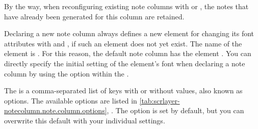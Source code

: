 By the way, when reconfiguring existing note columns with
 or , the notes that have
already been generated for this column are retained.

%
%
Declaring a new note column always defines a new element for changing its font
attributes with  and
, if such an element does not yet exist.
The name of the element is . For
this reason, the default note column  has the
element . You can
directly specify the initial setting of the element's font when declaring a
note column by using the  option within the .%
%
%

The  is a comma-separated list of keys with or without
values, also known as options. The available options are listed in
\autoref{tab:scrlayer-notecolumn.note.column.options},
.
The  option is
set by default, but you can overwrite this default with your individual
settings.


